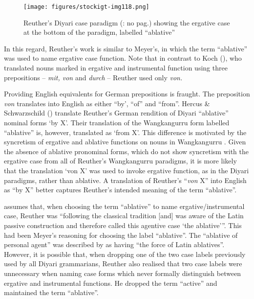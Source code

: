\begin{figure}
\texttt{[image: figures/stockigt-img118.png]}
\caption{Reuther's Diyari case paradigm (\citeyear{reuther_dieri_1894}: no pag.) showing the ergative case at the bottom of the paradigm, labelled “ablative''}
\label{bkm:Ref449368800}\label{fig:key:169}
\end{figure}

In this regard, Reuther’s work is similar to Meyer’s, in which the term “ablative” was used to name ergative case function. Note that in contrast to Koch (), who translated nouns marked in ergative and instrumental function using three prepositions – \textit{mit, von} and \textit{durch} – Reuther used only \textit{von.}

Providing English equivalents for German prepositions is fraught. The preposition \textit{von} translates into English as either “by’, “of” and “from''.  Hercus \& Schwarzschild (\citeyear[4]{a_three_1981}) translate Reuther’s German rendition of Diyari ``ablative'' nominal forms `by X'. Their translation of the Wangkangurru form labelled ``ablative'' \citeyearpar[31]{reuther_repr_1899} is, however, translated as `from X'. This difference is motivated by the syncretism of ergative and ablative functions on nouns in Wangkangurru \citep[66]{hercus_grammar_1994}. Given the absence of ablative pronominal forms, which do not show syncretism with the ergative case \citep[110]{hercus_grammar_1994} from all of Reuther’s Wangkangurru paradigms, it is more likely that the translation `von X' was used to invoke ergative function, as in the Diyari paradigms, rather than ablative. A translation of Reuther’s “\textit{von} X” into English as “by X” better captures Reuther’s intended meaning of the term “ablative''.

\citet[53]{austin_notitle_1981} assumes that, when choosing the term “ablative” to name ergative/instrumental case, Reuther was “following the classical tradition [and] was aware of the Latin passive construction and therefore called this agentive case `the ablative’\thinspace”. This had been Meyer’s reasoning for choosing the label “ablative''. The “ablative of personal agent” was described by \citet[38]{meyer_vocabulary_1843} as having “the force of Latin ablatives”. However, it is possible that, when dropping one of the two case labels previously used by all Diyari grammarians, Reuther also realised that two case labels were unnecessary when naming case forms which never formally distinguish between ergative and instrumental functions. He dropped the term “active” and maintained the term “ablative''.

